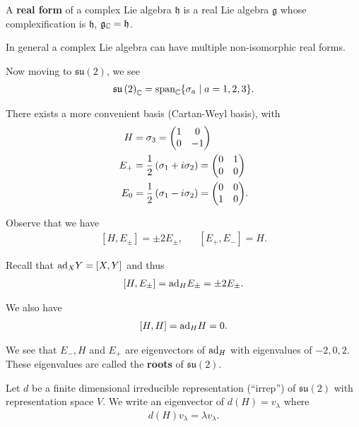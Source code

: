 \begin{definition}
    A \textbf{real form} of a complex Lie algebra $\mathfrak{h}$ is a real Lie algebra $\mathfrak{g}$ whose complexification is $\mathfrak{h}$, $\mathfrak{g}_{\mathbb{C}} = \mathfrak{h}$.
\end{definition}

In general a complex Lie algebra can have multiple non-isomorphic real forms.

Now moving to $\mathfrak{su}\left( 2 \right) $, we see
\begin{align}
    \mathfrak{su}\left( 2 \right)_{\mathbb{C}} = \text{span}_{\mathbb{C}} \{\sigma_a  \mid  a = 1,2,3\} 
.\end{align}

There exists a more convenient basis (Cartan-Weyl basis), with
\begin{align}
    H &= \sigma_3 = \mqty( 1 & 0 \\ 0 & -1) \\
    E_+ &= \frac{1}{2} \left( \sigma_1 + i \sigma_2 \right) = \mqty( 0 & 1 \\ 0 & 0) \\
    E_0 &= \frac{1}{2} \left( \sigma_1 - i \sigma_2 \right) = \mqty( 0 & 0 \\ 1 & 0)
.\end{align}

Observe that we have
\begin{align}
    \left[ H, E_{\pm} \right] = \pm 2 E_{\pm}, && \left[ E_+, E_- \right] = H
.\end{align}

Recall that $\text{ad}_X Y = \left[ X, Y \right] $ and thus
\begin{align}
    \left[ H, E_{\pm} \right] = \text{ad}_{H} E_{\pm} = \pm 2 E_{\pm}
.\end{align}

We also have
\begin{align}
    \left[ H, H \right]  = \text{ad}_H H = 0
.\end{align}

We see that $E_-, H$ and $E_+$ are eigenvectors of $\text{ad}_H$ with eigenvalues of $-2, 0, 2$. These eigenvalues are called the \textbf{roots} of $\mathfrak{su}\left( 2 \right)$.

Let $d$ be a finite dimensional irreducible representation (``irrep'') of $\mathfrak{su}\left( 2 \right) $ with representation space $V$. We write an eigenvector of $d \left( H \right) = v_\lambda$ where 
\begin{align}
    d\left( H \right) v_{\lambda} = \lambda v_\lambda
.\end{align}

